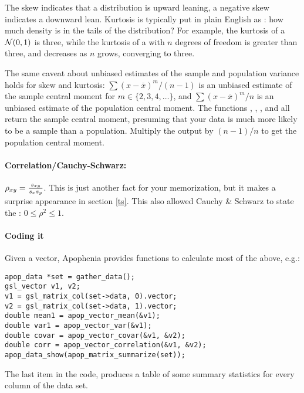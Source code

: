 The skew indicates that a distribution is upward leaning, a negative
skew indicates a downward lean. Kurtosis is typically put in plain
English as : how much density is in the tails of the
distribution? For example, the kurtosis of a ${\cal N}(0,1)$ is three,
while the kurtosis of a  with $n$ degrees of
freedom is greater than three, and decreases as $n$ grows, converging to
three.

The same caveat about unbiased estimates of the sample and population
variance holds for skew and kurtosis: $\sum (x-\overline x)^m/(n-1)$
is an unbiased estimate of the sample central moment for $m \in\{2, 3,
4, \dots\}$, and $\sum (x-\overline x)^m/n$ is an unbiased estimate of
the population central moment. The functions
,
,
, and
 all return the sample central
moment, presuming that your data is much more likely to be a sample than
a population. Multiply the output by $(n-1)/n$ to get the population
central moment.

\paragraph{Correlation/Cauchy-Schwarz:} $\rho_{xy}={s_{xy}\over s_x
s_y}$. This is just another fact for your memorization, but it makes a
surprise appearance in section \ref{ts}. This also allowed Cauchy \&
Schwarz to state the : $0\leq \rho^2 \leq 1$.
\label{correlation}

\paragraph{Coding it} Given a vector, Apophenia provides functions to
calculate most of the above, e.g.:

\begin{lstlisting}
apop_data *set = gather_data();
gsl_vector v1, v2;
v1 = gsl_matrix_col(set->data, 0).vector;
v2 = gsl_matrix_col(set->data, 1).vector;
double mean1 = apop_vector_mean(&v1);
double var1 = apop_vector_var(&v1);
double covar = apop_vector_covar(&v1, &v2);
double corr = apop_vector_correlation(&v1, &v2);
apop_data_show(apop_matrix_summarize(set));
\end{lstlisting}
The last item in the code,  produces a table of
some summary statistics for every column of the data set.

